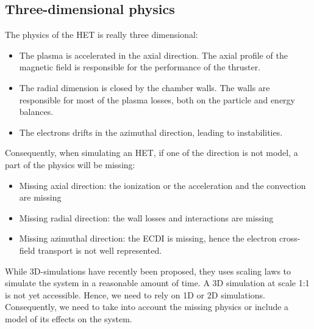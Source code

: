 \subsection{Three-dimensional physics}
\label{sec-3Dphi}

The physics of the \ac{HET} is really three dimensional\string:

\begin{itemize}
  \item The plasma is accelerated in the axial direction. The axial profile of the magnetic field is responsible for the performance of the thruster.
  \item The radial dimension is closed by the chamber walls. The walls are responsible for most of the plasma losses, both on the particle and energy balances.
  \item The electrons drifts in the azimuthal direction, leading to instabilities.
\end{itemize}

Consequently, when simulating an \ac{HET}, if one of the direction is not model, a part of the physics will be missing\string:
\begin{itemize}
  \item Missing axial direction\string: the ionization or the acceleration and the convection are missing
  \item Missing radial direction\string: the wall losses and interactions are missing
  \item Missing azimuthal direction\string: the \ac{ECDI} is missing, hence the electron cross-field transport is not well represented.
\end{itemize}

While \ac{3D}-simulations have recently been proposed, they uses scaling laws to simulate the system in a reasonable amount of time.
A \ac{3D} simulation at scale {1\string:1} is not yet accessible.
Hence, we need to rely on \ac{1D} or \ac{2D} simulations.
Consequently, we need to take into account the missing physics or include a model of its effects on the system.
